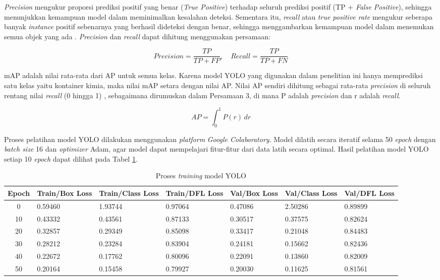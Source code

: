 \textit{Precision} mengukur proporsi prediksi positif yang benar (\textit{True
Positive}) terhadap seluruh prediksi positif (TP + \textit{False Positive}),
sehingga menunjukkan kemampuan model dalam meminimalkan kesalahan
deteksi. Sementara itu, \textit{recall} atau \textit{true positive
rate} mengukur seberapa banyak \textit{instance} positif sebenarnya yang
berhasil dideteksi dengan benar, sehingga menggambarkan kemampuan
model dalam menemukan semua objek yang ada \citep{23}. \textit{Precision} dan
\textit{recall} dapat dihitung menggunakan persamaan:

\begin{equation}
  Precision = \frac{TP}{TP + FP}, \quad
  Recall = \frac{TP}{TP + FN}
\end{equation}

mAP adalah nilai rata-rata dari AP untuk semua kelas. Karena model
YOLO yang digunakan dalam penelitian ini hanya
memprediksi satu kelas yaitu kontainer kimia, maka nilai mAP setara
dengan nilai AP. Nilai AP sendiri dihitung sebagai rata-rata
\textit{precision} di seluruh
rentang nilai \textit{recall} (0 hingga 1) \citep{24}, sebagaimana
dirumuskan dalam
Persamaan 3, di mana P adalah \textit{precision} dan r adalah \textit{recall}.

\begin{equation}
  AP = \int_{0}^{1} P(r) \,dr
\end{equation}

Proses pelatihan model YOLO dilakukan menggunakan \textit{platform}
\textit{Google
Colaboratory}. Model dilatih secara iteratif selama 50 \textit{epoch} dengan
\textit{batch size} 16 dan \textit{optimizer} Adam, agar model dapat mempelajari
fitur-fitur dari data latih secara optimal. Hasil pelatihan model
YOLO setiap 10 \textit{epoch} dapat dilihat pada Tabel \ref{tab:yolo-train}.

\begin{table}[H]
  \caption{Proses \textit{training} model YOLO}
  \label{tab:yolo-train}
  \vspace{-1em}
  \centering
  \footnotesize
  \begin{tabular}{c p{1.5cm} p{1.5cm} p{1.5cm} p{1.5cm} p{1.5cm} p{1.5cm}}
    \toprule
    \textbf{Epoch} & \textbf{Train/Box Loss} & \textbf{Train/Class Loss}
    & \textbf{Train/DFL Loss} & \textbf{Val/Box Loss}
    & \textbf{Val/Class Loss} & \textbf{Val/DFL Loss} \\
    \midrule
    0 & 0.59460 & 1.93744 & 0.97064 & 0.47086 & 2.50286 & 0.89899 \\
    10 & 0.43332 & 0.43561 & 0.87133 & 0.30517 & 0.37575 & 0.82624 \\
    20 & 0.32857 & 0.29349 & 0.85098 & 0.33417 & 0.21048 & 0.84483 \\
    30 & 0.28212 & 0.23284 & 0.83904 & 0.24181 & 0.15662 & 0.82436 \\
    40 & 0.22672 & 0.17762 & 0.80096 & 0.22091 & 0.13860 & 0.82009 \\
    50 & 0.20164 & 0.15458 & 0.79927 & 0.20030 & 0.11625 & 0.81561 \\
    \bottomrule
  \end{tabular}
  \normalsize
\end{table}

